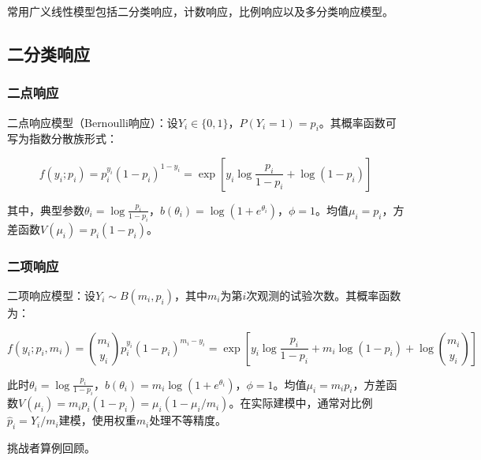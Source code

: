 \documentclass[
]{book}
\newenvironment{Shaded}{\begin{snugshade}}{\end{snugshade}}
\newcommand{\AttributeTok}[1]{\textcolor[rgb]{0.13,0.29,0.53}{#1}}
\newcommand{\CommentTok}[1]{\textcolor[rgb]{0.56,0.35,0.01}{\textit{#1}}}
\newcommand{\DecValTok}[1]{\textcolor[rgb]{0.00,0.00,0.81}{#1}}
\newcommand{\FunctionTok}[1]{\textcolor[rgb]{0.13,0.29,0.53}{\textbf{#1}}}
\newcommand{\NormalTok}[1]{#1}
\newcommand{\OtherTok}[1]{\textcolor[rgb]{0.56,0.35,0.01}{#1}}
\newcommand{\SpecialCharTok}[1]{\textcolor[rgb]{0.81,0.36,0.00}{\textbf{#1}}}
\newcommand{\StringTok}[1]{\textcolor[rgb]{0.31,0.60,0.02}{#1}}
\begin{document}
常用广义线性模型包括二分类响应，计数响应，比例响应以及多分类响应模型。

\subsection{二分类响应}\label{ux4e8cux5206ux7c7bux54cdux5e94}

\subsubsection{二点响应}\label{ux4e8cux70b9ux54cdux5e94}

二点响应模型（Bernoulli响应）：设\(Y_i \in \{0, 1\}\)，\(P(Y_i = 1) = p_i\)。其概率函数可写为指数分散族形式：

\[f(y_i; p_i) = p_i^{y_i}(1-p_i)^{1-y_i} = \exp\left[y_i \log\frac{p_i}{1-p_i} + \log(1-p_i)\right]\]

其中，典型参数\(\theta_i = \log\frac{p_i}{1-p_i}\)，\(b(\theta_i) = \log(1+e^{\theta_i})\)，\(\phi = 1\)。均值\(\mu_i = p_i\)，方差函数\(V(\mu_i) = p_i(1-p_i)\)。

\subsubsection{二项响应}\label{ux4e8cux9879ux54cdux5e94}

二项响应模型：设\(Y_i \sim B(m_i, p_i)\)，其中\(m_i\)为第\(i\)次观测的试验次数。其概率函数为：

\[f(y_i; p_i, m_i) = \binom{m_i}{y_i} p_i^{y_i} (1-p_i)^{m_i - y_i} = \exp\left[y_i \log\frac{p_i}{1-p_i} + m_i \log(1-p_i) + \log\binom{m_i}{y_i}\right]\]

此时\(\theta_i = \log\frac{p_i}{1-p_i}\)，\(b(\theta_i) = m_i \log(1+e^{\theta_i})\)，\(\phi = 1\)。均值\(\mu_i = m_i p_i\)，方差函数\(V(\mu_i) = m_i p_i (1-p_i) = \mu_i(1 - \mu_i/m_i)\)。在实际建模中，通常对比例\(\hat{p}_i = Y_i/m_i\)建模，使用权重\(m_i\)处理不等精度。

挑战者算例回顾。

\begin{Shaded}
\end{Shaded}
\end{document}
